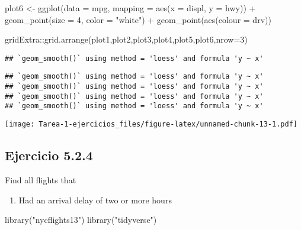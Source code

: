 \documentclass[
]{article}
\newenvironment{Shaded}{\begin{snugshade}}{\end{snugshade}}
\newcommand{\AttributeTok}[1]{\textcolor[rgb]{0.77,0.63,0.00}{#1}}
\newcommand{\DecValTok}[1]{\textcolor[rgb]{0.00,0.00,0.81}{#1}}
\newcommand{\FunctionTok}[1]{\textcolor[rgb]{0.00,0.00,0.00}{#1}}
\newcommand{\NormalTok}[1]{#1}
\newcommand{\OtherTok}[1]{\textcolor[rgb]{0.56,0.35,0.01}{#1}}
\newcommand{\SpecialCharTok}[1]{\textcolor[rgb]{0.00,0.00,0.00}{#1}}
\newcommand{\StringTok}[1]{\textcolor[rgb]{0.31,0.60,0.02}{#1}}
\providecommand{\tightlist}{%
  \setlength{\itemsep}{0pt}\setlength{\parskip}{0pt}}
\begin{document}
\begin{Shaded}
\begin{Highlighting}[]
\NormalTok{plot6 }\OtherTok{\textless{}{-}} \FunctionTok{ggplot}\NormalTok{(}\AttributeTok{data =}\NormalTok{ mpg, }\AttributeTok{mapping =} \FunctionTok{aes}\NormalTok{(}\AttributeTok{x =}\NormalTok{ displ, }\AttributeTok{y =}\NormalTok{ hwy)) }\SpecialCharTok{+}
  \FunctionTok{geom\_point}\NormalTok{(}\AttributeTok{size =} \DecValTok{4}\NormalTok{, }\AttributeTok{color =} \StringTok{"white"}\NormalTok{) }\SpecialCharTok{+}
  \FunctionTok{geom\_point}\NormalTok{(}\FunctionTok{aes}\NormalTok{(}\AttributeTok{colour =}\NormalTok{ drv))}

\NormalTok{gridExtra}\SpecialCharTok{::}\FunctionTok{grid.arrange}\NormalTok{(plot1,plot2,plot3,plot4,plot5,plot6,}\AttributeTok{nrow=}\DecValTok{3}\NormalTok{)}
\end{Highlighting}
\end{Shaded}

\begin{verbatim}
## `geom_smooth()` using method = 'loess' and formula 'y ~ x'
\end{verbatim}

\begin{verbatim}
## `geom_smooth()` using method = 'loess' and formula 'y ~ x'
## `geom_smooth()` using method = 'loess' and formula 'y ~ x'
## `geom_smooth()` using method = 'loess' and formula 'y ~ x'
## `geom_smooth()` using method = 'loess' and formula 'y ~ x'
\end{verbatim}

\texttt{[image: Tarea-1-ejercicios\_files/figure-latex/unnamed-chunk-13-1.pdf]}

\hypertarget{ejercicio-5.2.4}{%
\subsection{Ejercicio 5.2.4}\label{ejercicio-5.2.4}}

Find all flights that

\begin{enumerate}
\def\labelenumi{\arabic{enumi}.}
\tightlist
\item
  Had an arrival delay of two or more hours
\end{enumerate}

\begin{Shaded}
\begin{Highlighting}[]
\FunctionTok{library}\NormalTok{(}\StringTok{"nycflights13"}\NormalTok{)}
\FunctionTok{library}\NormalTok{(}\StringTok{"tidyverse"}\NormalTok{)}
\end{Highlighting}
\end{Shaded}
\end{document}
